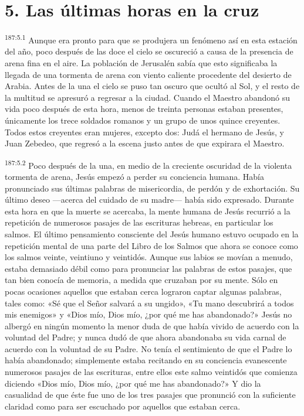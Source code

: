 \section*{5. Las últimas horas en la cruz}
\par 
\textsuperscript{187:5.1} Aunque era pronto para que se produjera un fenómeno así en esta estación del año, poco después de las doce el cielo se oscureció a causa de la presencia de arena fina en el aire. La población de Jerusalén sabía que esto significaba la llegada de una tormenta de arena con viento caliente procedente del desierto de Arabia. Antes de la una el cielo se puso tan oscuro que ocultó al Sol, y el resto de la multitud se apresuró a regresar a la ciudad. Cuando el Maestro abandonó su vida poco después de esta hora, menos de treinta personas estaban presentes, únicamente los trece soldados romanos y un grupo de unos quince creyentes. Todos estos creyentes eran mujeres, excepto dos: Judá el hermano de Jesús, y Juan Zebedeo, que regresó a la escena justo antes de que expirara el Maestro.

\par 
\textsuperscript{187:5.2} Poco después de la una, en medio de la creciente oscuridad de la violenta tormenta de arena, Jesús empezó a perder su conciencia humana. Había pronunciado sus últimas palabras de misericordia, de perdón y de exhortación. Su último deseo ---acerca del cuidado de su madre--- había sido expresado. Durante esta hora en que la muerte se acercaba, la mente humana de Jesús recurrió a la repetición de numerosos pasajes de las escrituras hebreas, en particular los salmos. El último pensamiento consciente del Jesús humano estuvo ocupado en la repetición mental de una parte del Libro de los Salmos que ahora se conoce como los salmos veinte, veintiuno y veintidós. Aunque sus labios se movían a menudo, estaba demasiado débil como para pronunciar las palabras de estos pasajes, que tan bien conocía de memoria, a medida que cruzaban por su mente. Sólo en pocas ocasiones aquellos que estaban cerca lograron captar algunas palabras, tales como: «Sé que el Señor salvará a su ungido», «Tu mano descubrirá a todos mis enemigos» y «Dios mío, Dios mío, ¿por qué me has abandonado?» Jesús no albergó en ningún momento la menor duda de que había vivido de acuerdo con la voluntad del Padre; y nunca dudó de que ahora abandonaba su vida carnal de acuerdo con la voluntad de su Padre. No tenía el sentimiento de que el Padre lo había abandonado; simplemente estaba recitando en su conciencia evanescente numerosos pasajes de las escrituras, entre ellos este salmo veintidós que comienza diciendo «Dios mío, Dios mío, ¿por qué me has abandonado?» Y dio la casualidad de que éste fue uno de los tres pasajes que pronunció con la suficiente claridad como para ser escuchado por aquellos que estaban cerca.

